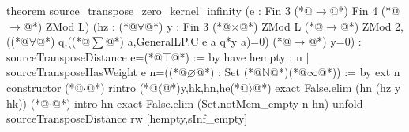 theorem source_transpose_zero_kernel_infinity (e : Fin 3 (*@$\to$@*) Fin 4 (*@$\to$@*) ZMod L)
    (hz : (*@$\forall$@*) y : Fin 3 (*@$\times$@*) ZMod L (*@$\to$@*) ZMod 2,
      ((*@$\forall$@*) q,((*@$\sum$@*) a,GeneralLP.C e a q*y a)=0) (*@$\to$@*) y=0) : sourceTransposeDistance e=(*@$\top$@*) := by
  have hempty : {n | sourceTransposeHasWeight e n}=((*@$\varnothing$@*) : Set (*@$\mathbb N$@*)(*@$\infty$@*)) := by
    ext n
    constructor
    (*@$\cdot$@*) rintro (*@$\langle$@*)y,hk,hn,he(*@$\rangle$@*)
      exact False.elim (hn (hz y hk))
    (*@$\cdot$@*) intro hn
      exact False.elim (Set.notMem_empty n hn)
  unfold sourceTransposeDistance
  rw [hempty,sInf_empty]
